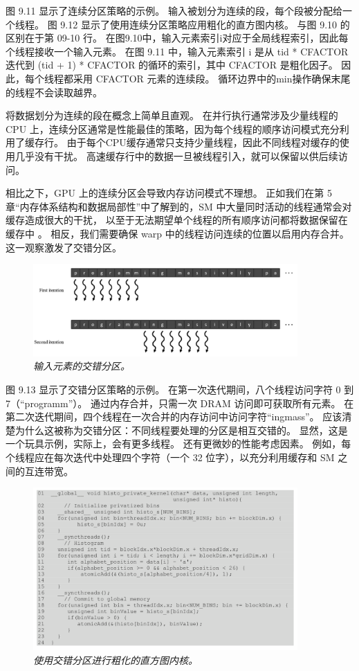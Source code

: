 图 9.11 显示了连续分区策略的示例。 输入被划分为连续的段，每个段被分配给一个线程。 
图 9.12 显示了使用连续分区策略应用粗化的直方图内核。 与图 9.10 的区别在于第 09-10 行。 
在图9.10中，输入元素索引i对应于全局线程索引，因此每个线程接收一个输入元素。 
在图 9.11 中，输入元素索引 i 是从 tid * CFACTOR 迭代到 (tid + 1) * CFACTOR 的循环的索引，其中 CFACTOR 是粗化因子。 
因此，每个线程都采用 CFACTOR 元素的连续段。 循环边界中的min操作确保末尾的线程不会读取越界。

将数据划分为连续的段在概念上简单且直观。 
在并行执行通常涉及少量线程的 CPU 上，连续分区通常是性能最佳的策略，因为每个线程的顺序访问模式充分利用了缓存行。 
由于每个CPU缓存通常只支持少量线程，因此不同线程对缓存的使用几乎没有干扰。 
高速缓存行中的数据一旦被线程引入，就可以保留以供后续访问。

相比之下，GPU 上的连续分区会导致内存访问模式不理想。 
正如我们在第 5 章“内存体系结构和数据局部性”中了解到的，SM 中大量同时活动的线程通常会对缓存造成很大的干扰，
以至于无法期望单个线程的所有顺序访问都将数据保留在缓存中 。 
相反，我们需要确保 warp 中的线程访问连续的位置以启用内存合并。 这一观察激发了交错分区。

\begin{figure}[H]
	\centering
	\includegraphics[width=0.9\textwidth]{figs/F9.13.png}
	\caption{\textit{输入元素的交错分区。}}
\end{figure}

图 9.13 显示了交错分区策略的示例。 在第一次迭代期间，八个线程访问字符 0 到 7（“programm”）。 
通过内存合并，只需一次 DRAM 访问即可获取所有元素。 在第二次迭代期间，四个线程在一次合并的内存访问中访问字符“ingmass”。 
应该清楚为什么这被称为交错分区：不同线程要处理的分区是相互交错的。 显然，这是一个玩具示例，实际上，会有更多线程。 
还有更微妙的性能考虑因素。 例如，每个线程应在每次迭代中处理四个字符（一个 32 位字），以充分利用缓存和 SM 之间的互连带宽。

\begin{figure}[H]
	\centering
	\includegraphics[width=0.9\textwidth]{figs/F9.14.png}
	\caption{\textit{使用交错分区进行粗化的直方图内核。}}
\end{figure}

